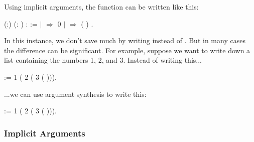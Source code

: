 \documentclass[12pt]{report}
\begin{document}
    Using implicit arguments, the  function can be written
    like this: \begin{coqdoccode}
\coqdocemptyline
\coqdocnoindent
{}  (:) (: ) :  :=\coqdoceol
\coqdocindent{1.00em}
  \coqdoceol
\coqdocindent{1.00em}
\ensuremath{|}       \ensuremath{\Rightarrow} 0\coqdoceol
\coqdocindent{1.00em}
\ensuremath{|}    \ensuremath{\Rightarrow}  ( \coqdocvar{\_} )\coqdoceol
\coqdocindent{1.00em}
.\coqdoceol
\coqdocemptyline
\end{coqdoccode}
In this instance, we don't save much by writing \coqdocvar{\_} instead of
    .  But in many cases the difference can be significant.  For
    example, suppose we want to write down a list containing the
    numbers 1, 2, and 3.  Instead of writing this... \begin{coqdoccode}
\coqdocemptyline
\coqdocnoindent
{}  :=\coqdoceol
\coqdocindent{1.00em}
  1 (  2 (  3 ( ))).\coqdoceol
\coqdocemptyline
\end{coqdoccode}
...we can use argument synthesis to write this: \begin{coqdoccode}
\coqdocemptyline
\coqdocnoindent
{}  :=  \coqdocvar{\_} 1 ( \coqdocvar{\_} 2 ( \coqdocvar{\_} 3 ( \coqdocvar{\_}))).\coqdoceol
\coqdocemptyline
\end{coqdoccode}
\subsubsection{Implicit Arguments}
\end{document}

